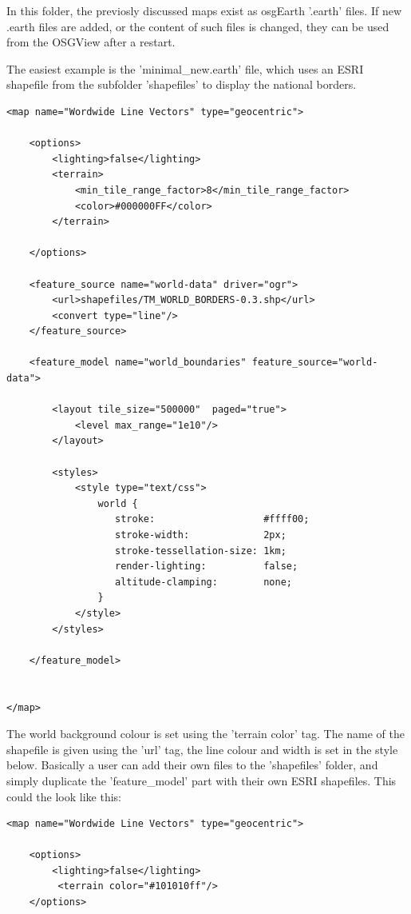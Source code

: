 {In this folder, the previosly discussed maps exist as osgEarth '.earth' files. If new .earth files are added, or the content of such files is changed, they can be used from the OSGView after a restart.

The easiest example is the 'minimal\_new.earth' file, which uses an ESRI shapefile from the subfolder 'shapefiles' to display the national borders.

\begin{verbatim}
<map name="Wordwide Line Vectors" type="geocentric">
  
    <options>
        <lighting>false</lighting>
        <terrain>
            <min_tile_range_factor>8</min_tile_range_factor>
            <color>#000000FF</color>
        </terrain>
      
    </options>

    <feature_source name="world-data" driver="ogr">
        <url>shapefiles/TM_WORLD_BORDERS-0.3.shp</url>
        <convert type="line"/>
    </feature_source>
    
    <feature_model name="world_boundaries" feature_source="world-data">
        
        <layout tile_size="500000"  paged="true">
            <level max_range="1e10"/>
        </layout>
                
        <styles>
            <style type="text/css">
                world {
                   stroke:                   #ffff00;
                   stroke-width:             2px;
                   stroke-tessellation-size: 1km;
                   render-lighting:          false;
                   altitude-clamping:        none;
                }            
            </style>
        </styles>
        
    </feature_model>
 

</map>
\end{verbatim}

The world background colour is set using the 'terrain color' tag. The name of the shapefile is given using the 'url' tag, the line colour and width is set in the style below. Basically a user can add their own files to the 'shapefiles' folder, and simply duplicate the 'feature\_model' part with their own ESRI shapefiles. This could the look like this:

\begin{verbatim}
<map name="Wordwide Line Vectors" type="geocentric">
  
    <options>
        <lighting>false</lighting>
         <terrain color="#101010ff"/>
    </options>


\end{verbatim}}
